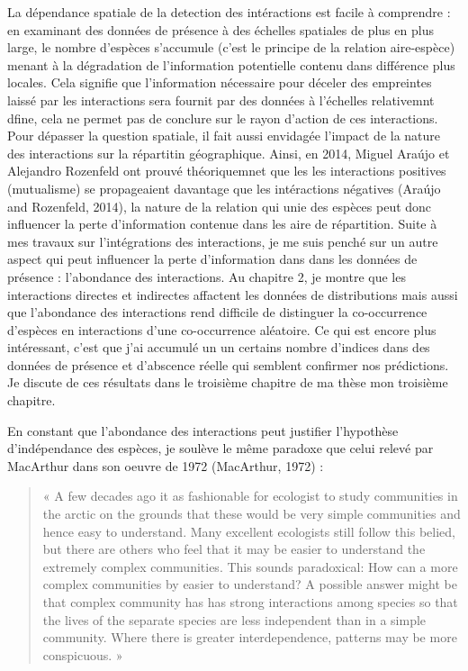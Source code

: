 La dépendance spatiale de la detection des intéractions est facile à
comprendre : en examinant des données de présence à des échelles
spatiales de plus en plus large, le nombre d'espèces s'accumule (c'est
le principe de la relation aire-espèce) menant à la dégradation de
l'information potentielle contenu dans différence plus locales. Cela
signifie que l'information nécessaire pour déceler des empreintes laissé
par les interactions sera fournit par des données à l'échelles
relativemnt dfine, cela ne permet pas de conclure sur le rayon d'action
de ces interactions. Pour dépasser la question spatiale, il fait aussi
envidagée l'impact de la nature des interactions sur la répartitin
géographique. Ainsi, en 2014, Miguel Araújo et Alejandro Rozenfeld ont
prouvé théoriquemnet que les les interactions positives (mutualisme) se
propageaient davantage que les intéractions négatives (Araújo and
Rozenfeld, 2014), la nature de la relation qui unie des espèces peut
donc influencer la perte d'information contenue dans les aire de
répartition. Suite à mes travaux sur l'intégrations des interactions, je
me suis penché sur un autre aspect qui peut influencer la perte
d'information dans dans les données de présence : l'abondance des
interactions. Au chapitre 2, je montre que les interactions directes et
indirectes affactent les données de distributions mais aussi que
l'abondance des interactions rend difficile de distinguer la
co-occurrence d'espèces en interactions d'une co-occurrence aléatoire.
Ce qui est encore plus intéressant, c'est que j'ai accumulé un un
certains nombre d'indices dans des données de présence et d'abscence
réelle qui semblent confirmer nos prédictions. Je discute de ces
résultats dans le troisième chapitre de ma thèse mon troisième chapitre.

En constant que l'abondance des interactions peut justifier l'hypothèse
d'indépendance des espèces, je soulève le même paradoxe que celui relevé
par MacArthur dans son oeuvre de 1972 (MacArthur, 1972) :

\begin{quote}
« A few decades ago it as fashionable for ecologist to study communities
in the arctic on the grounds that these would be very simple communities
and hence easy to understand. Many excellent ecologists still follow
this belied, but there are others who feel that it may be easier to
understand the extremely complex communities. This sounds paradoxical:
How can a more complex communities by easier to understand? A possible
answer might be that complex community has has strong interactions among
species so that the lives of the separate species are less independent
than in a simple community. Where there is greater interdependence,
patterns may be more conspicuous. »
\end{quote}

